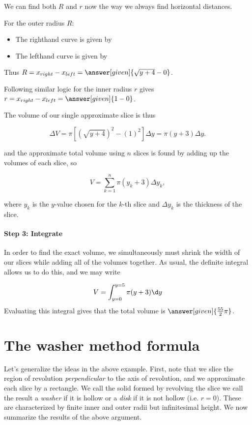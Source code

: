 \documentclass{ximera}
\begin{document}
\begin{model}
We can find both $R$ and $r$ now the way we always find horizontal distances.

For the outer radius $R$:

\begin{itemize}
\item The righthand curve is given by 
\item The lefthand curve is given by 
\end{itemize}

Thus $R = x_{right}-x_{left} = \answer[given]{\sqrt{y+4}-0}$.
            
Following similar logic for the inner radius $r$ gives $r = x_{right}-x_{left} = \answer[given]{1-0}$.   
   
The volume of our single approximate slice is thus

\[
\Delta V = \pi\left[\left(\sqrt{y+4}\right)^2-(1)^2\right]\Delta y = \pi(y+3)\Delta y.
\]   
   
and the approximate total volume using $n$ slices is found by adding up the volumes of each slice, so
   
\[
V = \sum_{k=1}^n \pi(y_k+3)\Delta y_k,
\]      

where $y_k$ is the $y$-value chosen for the $k$-th slice and $\Delta y_k$ is the thickness of the slice.
   
\paragraph{Step 3: Integrate}
In order to find the exact volume, we simultaneously must shrink the width of our slices while adding all of the volumes together.  As usual, the definite integral allows us to do this, and we may write

\[
V= \int_{y=0}^{y=5} \pi(y+3) \d y 
\]    
Evaluating this integral gives that the total volume is $\answer[given]{\frac{55}{2}\pi}$.   
\end{model}

\section{The washer method formula}
Let's generalize the ideas in the above example.  First, note that we slice the region of revolution \emph{perpendicular} to the axis of revolution, and we approximate each slice by a rectangle.  We call the solid formed by revolving the slice we call the result a \emph{washer} if it is hollow or a \emph{disk} if it is not hollow (i.e. $r=0$).  These are characterized by finite inner and outer radii but infinitesimal height.  
We now summarize the results of the above argument.
\end{document}
